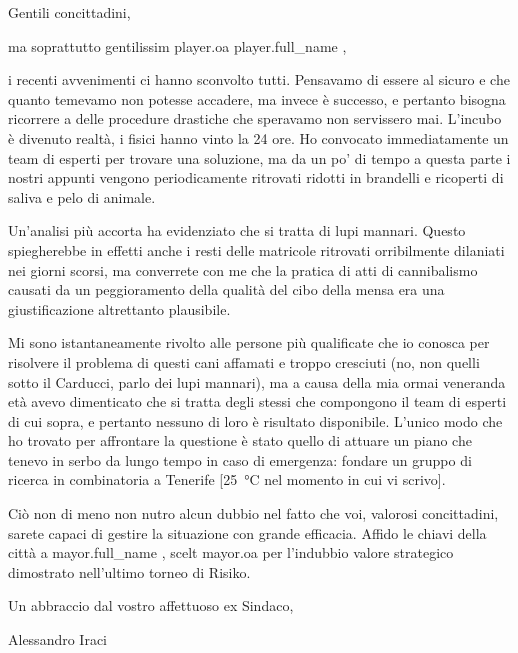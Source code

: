 \documentclass{letter}
\date{28 febbraio 2018}
\begin{document}
\begin{letter}{}
\opening{Gentili concittadini,}

ma soprattutto gentilissim{{ player.oa }} {{ player.full_name }},

i recenti avvenimenti ci hanno sconvolto tutti. Pensavamo di essere al sicuro e che quanto temevamo non potesse accadere, ma invece è successo, e pertanto bisogna ricorrere a delle procedure drastiche che speravamo non servissero mai. L'incubo è divenuto realtà, i fisici hanno vinto la 24 ore. Ho convocato immediatamente un team di esperti per trovare una soluzione, ma da un po' di tempo a questa parte i nostri appunti vengono periodicamente ritrovati ridotti in brandelli e ricoperti di saliva e pelo di animale.

Un'analisi più accorta ha evidenziato che si tratta di lupi mannari. Questo spiegherebbe in effetti anche i resti delle matricole ritrovati orribilmente dilaniati nei giorni scorsi, ma converrete con me che la pratica di atti di cannibalismo causati da un peggioramento della qualità del cibo della mensa era una giustificazione altrettanto plausibile.

Mi sono istantaneamente rivolto alle persone più qualificate che io conosca per risolvere il problema di questi cani affamati e troppo cresciuti (no, non quelli sotto il Carducci, parlo dei lupi mannari), ma a causa della mia ormai veneranda età avevo dimenticato che si tratta degli stessi che compongono il team di esperti di cui sopra, e pertanto nessuno di loro è risultato disponibile. L'unico modo che ho trovato per affrontare la questione è stato quello di attuare un piano che tenevo in serbo da lungo tempo in caso di emergenza: fondare un gruppo di ricerca in combinatoria a Tenerife [\SI{25}{\celsius} nel momento in cui vi scrivo].

Ciò non di meno non nutro alcun dubbio nel fatto che voi, valorosi concittadini, sarete capaci di gestire la situazione con grande efficacia. Affido le chiavi della città a {{ mayor.full_name }}, scelt{{ mayor.oa }} per l'indubbio valore strategico dimostrato nell'ultimo torneo di Risiko.

Un abbraccio dal vostro affettuoso ex Sindaco,

\bigskip

\noindent Alessandro Iraci

\end{letter}
\end{document}

